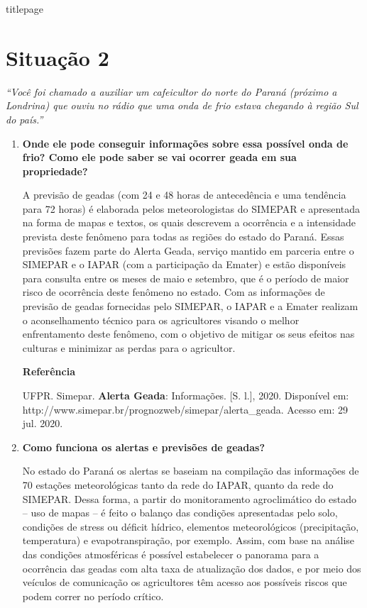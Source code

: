 \documentclass[a4paper, 12pt, brazilian]{article}
\begin{document}
	{titlepage}
	
	\section{Situação 2}
	
	\textit{``Você foi chamado a auxiliar um cafeicultor do norte do Paraná (próximo a Londrina) que ouviu no rádio que uma onda de frio estava chegando à região Sul do país.''}
	
	\begin{enumerate}
		\item\textbf{Onde ele pode conseguir informações sobre essa possível onda de frio? Como ele pode saber se vai ocorrer geada em sua propriedade?}
		
		\hspace{.5cm} A previsão de geadas (com 24 e 48 horas de antecedência e uma tendência para 72 horas) é elaborada pelos meteorologistas do SIMEPAR e apresentada na forma de mapas e textos, os quais descrevem a ocorrência e a intensidade prevista deste fenômeno para todas as regiões do estado do Paraná.
		Essas previsões fazem parte do Alerta Geada, serviço mantido em parceria entre o SIMEPAR e o IAPAR (com a participação da Emater) e estão disponíveis para consulta entre os meses de maio e setembro, que é o período de maior risco de ocorrência deste fenômeno no estado.
		Com as informações de previsão de geadas fornecidas pelo SIMEPAR, o IAPAR e a Emater realizam o aconselhamento técnico para os agricultores visando o melhor enfrentamento deste fenômeno, com o objetivo de mitigar os seus efeitos nas culturas e minimizar as perdas para o agricultor.
		
		\textbf{Referência}
		
		UFPR. Simepar. \textbf{Alerta Geada}: Informações. [S. l.], 2020. Disponível em: http://www.simepar.br/prognozweb/simepar/alerta\_geada. Acesso em: 29 jul. 2020.
		
		\item\textbf{Como funciona os alertas e previsões de geadas?}
		
		\hspace{.5cm}No estado do Paraná os alertas se baseiam na compilação das informações de 70 estações meteorológicas tanto da rede do IAPAR, quanto da rede do SIMEPAR. Dessa forma, a partir do monitoramento agroclimático do estado -- uso de mapas -- é feito o balanço das condições apresentadas pelo solo, condições de stress ou déficit hídrico, elementos meteorológicos (precipitação, temperatura) e evapotranspiração, por exemplo. Assim, com base na análise das condições atmosféricas é possível estabelecer o panorama para a ocorrência das geadas com alta taxa de atualização dos dados, e por meio dos veículos de comunicação os agricultores têm acesso aos possíveis riscos que podem correr no período crítico.
		

\end{enumerate}
\end{document}

